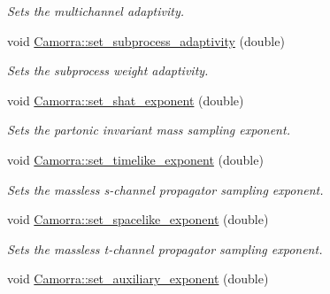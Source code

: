 \begin{DoxyCompactItemize}
\begin{DoxyCompactList}\small\item\em Sets the multichannel adaptivity. \end{DoxyCompactList}\item 
\hypertarget{a00798_ab925ee281e5dcc7918b910d9bf4776a1}{
void \hyperlink{a00798_ab925ee281e5dcc7918b910d9bf4776a1}{Camorra::set\_\-subprocess\_\-adaptivity} (double)}
\label{a00798_ab925ee281e5dcc7918b910d9bf4776a1}

\begin{DoxyCompactList}\small\item\em Sets the subprocess weight adaptivity. \end{DoxyCompactList}\item 
\hypertarget{a00798_a96dd98282eadc82c686136675e018496}{
void \hyperlink{a00798_a96dd98282eadc82c686136675e018496}{Camorra::set\_\-shat\_\-exponent} (double)}
\label{a00798_a96dd98282eadc82c686136675e018496}

\begin{DoxyCompactList}\small\item\em Sets the partonic invariant mass sampling exponent. \end{DoxyCompactList}\item 
\hypertarget{a00798_ad3d0d6efe216f895b234d2837d05aa2b}{
void \hyperlink{a00798_ad3d0d6efe216f895b234d2837d05aa2b}{Camorra::set\_\-timelike\_\-exponent} (double)}
\label{a00798_ad3d0d6efe216f895b234d2837d05aa2b}

\begin{DoxyCompactList}\small\item\em Sets the massless s-\/channel propagator sampling exponent. \end{DoxyCompactList}\item 
\hypertarget{a00798_a74a73247c6a606042f46091e82e67750}{
void \hyperlink{a00798_a74a73247c6a606042f46091e82e67750}{Camorra::set\_\-spacelike\_\-exponent} (double)}
\label{a00798_a74a73247c6a606042f46091e82e67750}

\begin{DoxyCompactList}\small\item\em Sets the massless t-\/channel propagator sampling exponent. \end{DoxyCompactList}\item 
\hypertarget{a00798_a42056a2964334e7944ad4d1d5b66f8f7}{
void \hyperlink{a00798_a42056a2964334e7944ad4d1d5b66f8f7}{Camorra::set\_\-auxiliary\_\-exponent} (double)}
\label{a00798_a42056a2964334e7944ad4d1d5b66f8f7}


\end{DoxyCompactItemize}
